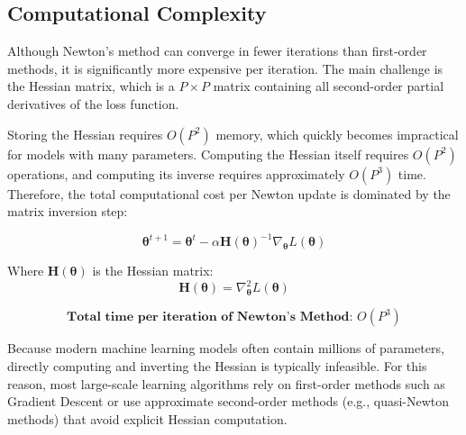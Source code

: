 \documentclass{article}
\newcommand{\vecb}[1]{\boldsymbol{#1}} %
\newcommand{\matb}[1]{\mathbf{#1}}     %
\begin{document}
\subsection{Computational Complexity}

Although Newton’s method can converge in fewer iterations than first-order methods, it is significantly more expensive per iteration. The main challenge is the Hessian matrix, which is a \(P \times P\) matrix containing all second-order partial derivatives of the loss function.

Storing the Hessian requires \(O(P^2)\) memory, which quickly becomes impractical for models with many parameters. Computing the Hessian itself requires \(O(P^2)\) operations, and computing its inverse requires approximately \(O(P^3)\) time. Therefore, the total computational cost per Newton update is dominated by the matrix inversion step:

\[
\vecb{\theta}^{t+1}
=
\vecb{\theta}^{t}
-\alpha \matb{H}(\vecb{\theta})^{-1}
\nabla_{\vecb{\theta}} L(\vecb{\theta})
\]

Where \(\matb{H}(\vecb{\theta})\) is the Hessian matrix:
\[
\matb{H}(\vecb{\theta})=\nabla_{\vecb{\theta}}^2 L(\vecb{\theta})
\]

\[
\boxed{\textbf{Total time per iteration of Newton's Method: } O(P^3)}
\]

Because modern machine learning models often contain millions of parameters, directly computing and inverting the Hessian is typically infeasible. For this reason, most large-scale learning algorithms rely on first-order methods such as Gradient Descent or use approximate second-order methods (e.g., quasi-Newton methods) that avoid explicit Hessian computation.




\end{document}
